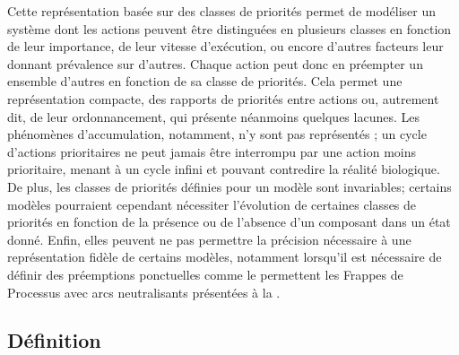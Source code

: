 Cette représentation basée sur des classes de priorités permet de modéliser un système
dont les actions peuvent être distinguées en plusieurs classes en fonction de leur importance,
de leur vitesse d'exécution, ou encore d'autres facteurs leur donnant prévalence sur d'autres.
Chaque action peut donc en préempter un ensemble d'autres en fonction de sa classe de priorités.
Cela permet une représentation compacte, des rapports de priorités entre actions
ou, autrement dit, de leur ordonnancement,
qui présente néanmoins quelques lacunes.
Les phénomènes d'accumulation, notamment, n'y sont pas représentés ;
un cycle d'actions prioritaires ne peut jamais être interrompu par une action moins prioritaire,
menant à un cycle infini et pouvant contredire la réalité biologique.
De plus, les classes de priorités définies pour un modèle sont invariables;
certains modèles pourraient cependant nécessiter l'évolution de certaines classes de priorités
en fonction de la présence ou de l'absence d'un composant dans un état donné.
Enfin, elles peuvent ne pas permettre la précision nécessaire à une représentation fidèle de
certains modèles, notamment lorsqu'il est nécessaire de définir des préemptions ponctuelles
comme le permettent les Frappes de Processus avec arcs neutralisants
présentées à la .



\subsection{Définition}

